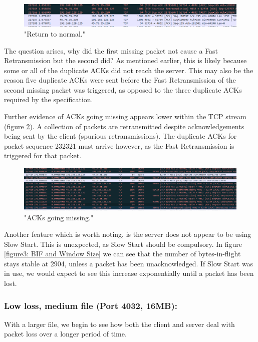 \documentclass[12pt]{article}
\begin{document}
\begin{figure}[!htbp]
  \centering
  \includegraphics[width=\linewidth]{4032-256KB-back-to-normal.PNG}
  \caption{"Return to normal."}
  \label{figure6: Return to normal}
\end{figure}

The question arises, why did the first missing packet not cause a Fast Retransmission but the second did?
As mentioned earlier, this is likely because some or all of the duplicate ACKs did not reach the server.
This may also be the reason five duplicate ACKs were sent before the Fast Retransmission of the second missing packet was triggered, as opposed to the three duplicate ACKs required by the specification. 

Further evidence of ACKs going missing appears lower within the TCP stream (figure \ref{figure7: Missing ACKs}).
A collection of packets are retransmitted despite acknowledgements being sent by the client (spurious retransmissions).
The duplicate ACKs for packet sequence 232321 must arrive however, as the Fast Retransmission is triggered for that packet.

\begin{figure}[!htbp]
  \centering
  \includegraphics[width=\linewidth]{4032-256KB-lost-acks.PNG}
  \caption{"ACKs going missing."}
  \label{figure7: Missing ACKs}
\end{figure}

Another feature which is worth noting, is the server does not appear to be using Slow Start.
This is unexpected, as Slow Start should be compulsory.
In figure \ref{figure3: BIF and Window Size} we can see that the number of bytes-in-flight stays stable at 2904, unless a packet has been unacknowledged.
If Slow Start was in use, we would expect to see this increase exponentially until a packet has been lost.

\subsubsection*{Low loss, medium file (Port 4032, 16MB):}
With a larger file, we begin to see how both the client and server deal with packet loss over a longer period of time.
\end{document}
